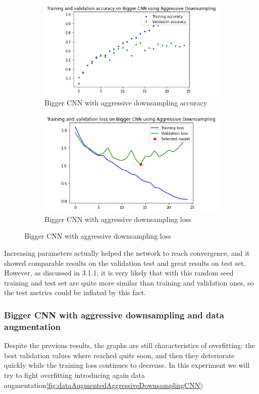 \begin{figure}[H]
	\begin{subfigure}{0.5\textwidth}
		\includegraphics[width=0.9\linewidth]{img/scratch/bigger_ad_acc.png} 
		\caption{Bigger CNN with aggressive downsampling accuracy}
		\label{fig:BiggerAggressiveDownsamplingacc}
	\end{subfigure}
	\begin{subfigure}{0.5\textwidth}
		\includegraphics[width=0.9\linewidth]{img/scratch/bigger_ad_loss.png}
		\caption{Bigger CNN with aggressive downsampling loss}
		\label{fig:BiggerAggressiveDownsamplingloss}
	\end{subfigure}
\end{figure}

\medskip

\noindent Increasing parameters actually helped the network to reach convergence, and it showed comparable results on the validation test and great results on test set. However, as discussed in 3.1.1, it is very likely that with this random seed training and test set are quite more similar than training and validation ones, so the test metrics could be inflated by this fact.

\subsubsection{Bigger CNN with aggressive downsampling and data augmentation}
Despite the previous results, the graphs are still characteristics of overfitting: the best validation values where reached quite soon, and then they deteriorate quickly while the training loss continues to decrease. In this experiment we will try to fight overfitting introducing again data augmentation\ref{fig:dataAugmentedAggressiveDownsamplingCNN}:

